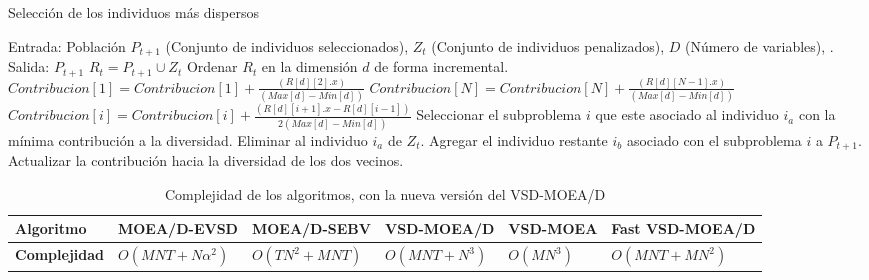\begin{algorithm}[H]
  \scriptsize
	\caption{Selección de los individuos más dispersos}
         \label{alg:Seleccion_individuos_dispersos}
	\begin{algorithmic}[1]
	\STATE Entrada: Población $P_{t+1}$ (Conjunto de individuos seleccionados), $Z_t$ (Conjunto de individuos penalizados), $D$ (Número de variables), .
	\STATE Salida: $P_{t+1}$ %
	\STATE $R_t = P_{t+1} \cup Z_t$ 
	   \STATE Ordenar $R_t$ en la dimensión $d$ de forma incremental.
	     \STATE $Contribucion[1] = Contribucion[1] + \frac{(R[d][2].x)}{(Max[d] - Min[d])}$
	     \STATE $Contribucion[N] = Contribucion[N] + \frac{(R[d][N-1].x)}{(Max[d] - Min[d])}$
	     \STATE $Contribucion[i] = Contribucion[i] + \frac{(R[d][i+1].x - R[d][i-1])}{2(Max[d] - Min[d])}$  
	    \ENDFOR
	\ENDFOR {}
	 
	   \STATE Seleccionar el subproblema $i$ que este asociado al individuo $i_a$ con la mínima contribución a la diversidad. 
	   \STATE Eliminar al individuo $i_a$ de $Z_t$.
	   \STATE Agregar el individuo restante $i_b$ asociado con el subproblema $i$ a $P_{t+1}$.
	   \STATE Actualizar la contribución hacia la diversidad de los dos vecinos.
	\ENDWHILE	{}

\end{algorithmic}
\end{algorithm}

\begin{table}[H]
\centering
\caption{Complejidad de los algoritmos, con la nueva versión del VSD-MOEA/D}
\label{my-label}
\begin{tabular}{|l|l|l|l|l|l|}
\hline
\textbf{Algoritmo} & MOEA/D-EVSD & MOEA/D-SEBV & VSD-MOEA/D & VSD-MOEA & Fast VSD-MOEA/D \\ \hline
\textbf{Complejidad} & $O( MNT + N \alpha^2)$ & $O(TN^2+MNT)$ & $O(MNT+N^3)$ & $O(MN^3)$ & $O(MNT+MN^2)$ \\ \hline
\end{tabular}
\end{table}





